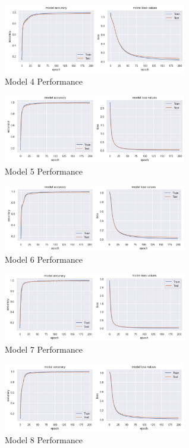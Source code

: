 \documentclass[conference]{IEEEtran}
\begin{document}
\begin{figure}[htp]
    \centering
    \includegraphics[width = 8cm]{Model4Performance.png}
    \caption{Model 4 Performance}
    \label{fig:Model4Performance}
\end{figure}

\begin{figure}[htp]
    \centering
    \includegraphics[width = 8cm]{Model5Performance.png}
    \caption{Model 5 Performance}
    \label{fig:Model5Performance}
\end{figure}

\begin{figure}[htp]
    \centering
    \includegraphics[width = 8cm]{Model6Performance.png}
    \caption{Model 6 Performance}
    \label{Model6Performance}
\end{figure}

\begin{figure}[htp]
    \centering
    \includegraphics[width = 8cm]{Model7Performance.png}
    \caption{Model 7 Performance}
    \label{fig:Model7Performance}
\end{figure}

\begin{figure}[htp]
    \centering
    \includegraphics[width = 8cm]{Model8Performance.png}
    \caption{Model 8 Performance}
    \label{fig:Model8Performance}
\end{figure}
\end{document}
